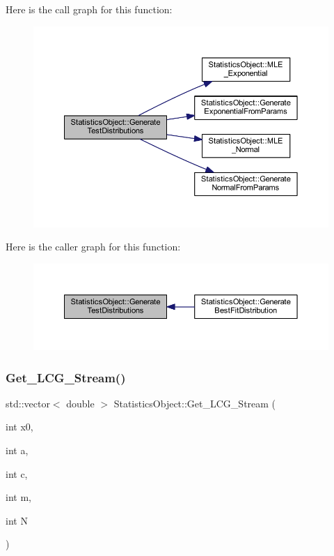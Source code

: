 Here is the call graph for this function\+:\nopagebreak
\begin{figure}[H]
\begin{center}
\leavevmode
\includegraphics[width=350pt]{class_statistics_object_a7efac97d5d339216bb81bd361419799d_cgraph}
\end{center}
\end{figure}
Here is the caller graph for this function\+:\nopagebreak
\begin{figure}[H]
\begin{center}
\leavevmode
\includegraphics[width=350pt]{class_statistics_object_a7efac97d5d339216bb81bd361419799d_icgraph}
\end{center}
\end{figure}
\mbox{\label{class_statistics_object_a983e11b6d3562ae303f5cc925be448e2}} 
\subsubsection{\texorpdfstring{Get\+\_\+\+L\+C\+G\+\_\+\+Stream()}{Get\_LCG\_Stream()}}
{\footnotesize\ttfamily std\+::vector$<$ double $>$ Statistics\+Object\+::\+Get\+\_\+\+L\+C\+G\+\_\+\+Stream (\begin{DoxyParamCaption}\item[{int}]{x0,  }\item[{int}]{a,  }\item[{int}]{c,  }\item[{int}]{m,  }\item[{int}]{N }\end{DoxyParamCaption})}



